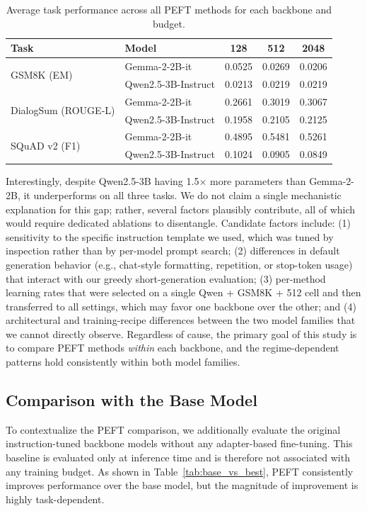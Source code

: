 \documentclass{article}
\begin{document}
\begin{table}[H]
\centering
\small
\caption{Average task performance across all PEFT methods for each backbone and budget.}
\label{tab:backbone_avg}
\begin{tabular}{llccc}
\toprule
Task & Model & 128 & 512 & 2048 \\
\midrule
\multirow{2}{*}{GSM8K (EM)} & Gemma-2-2B-it & 0.0525 & 0.0269 & 0.0206 \\
 & Qwen2.5-3B-Instruct & 0.0213 & 0.0219 & 0.0219 \\
\midrule
\multirow{2}{*}{DialogSum (ROUGE-L)} & Gemma-2-2B-it & 0.2661 & 0.3019 & 0.3067 \\
 & Qwen2.5-3B-Instruct & 0.1958 & 0.2105 & 0.2125 \\
\midrule
\multirow{2}{*}{SQuAD v2 (F1)} & Gemma-2-2B-it & 0.4895 & 0.5481 & 0.5261 \\
 & Qwen2.5-3B-Instruct & 0.1024 & 0.0905 & 0.0849 \\
\bottomrule
\end{tabular}
\end{table}

Interestingly, despite Qwen2.5-3B having 1.5$\times$ more parameters than Gemma-2-2B, it underperforms on all three tasks. We do not claim a single mechanistic explanation for this gap; rather, several factors plausibly contribute, all of which would require dedicated ablations to disentangle. Candidate factors include: (1) sensitivity to the specific instruction template we used, which was tuned by inspection rather than by per-model prompt search; (2) differences in default generation behavior (e.g., chat-style formatting, repetition, or stop-token usage) that interact with our greedy short-generation evaluation; (3) per-method learning rates that were selected on a single Qwen + GSM8K + 512 cell and then transferred to all settings, which may favor one backbone over the other; and (4) architectural and training-recipe differences between the two model families that we cannot directly observe. Regardless of cause, the primary goal of this study is to compare PEFT methods \emph{within} each backbone, and the regime-dependent patterns hold consistently within both model families.

\subsection{Comparison with the Base Model}
\label{sec:base_comparison}

To contextualize the PEFT comparison, we additionally evaluate the original instruction-tuned backbone models without any adapter-based fine-tuning. This baseline is evaluated only at inference time and is therefore not associated with any training budget. As shown in Table~\ref{tab:base_vs_best}, PEFT consistently improves performance over the base model, but the magnitude of improvement is highly task-dependent.
\end{document}
